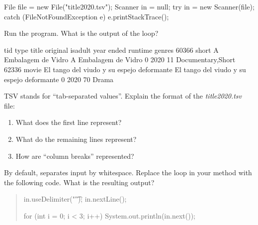 \begin{answer}[10em]
\begin{javaans}
File file = new File("title2020.tsv");
Scanner in = null;
try {
    in = new Scanner(file);
} catch (FileNotFoundException e) {
    e.printStackTrace();
}
\end{javaans}
\end{answer}


\Q Run the program. What is the output of the  loop?

\begin{answer}[4em]
\begin{javaans}
tid	type	title	original	isadult	year	ended	runtime	genres
60366	short	A Embalagem de Vidro	A Embalagem de Vidro	0	2020		11	Documentary,Short
62336	movie	El tango del viudo y su espejo deformante	El tango del viudo y su espejo deformante	0	2020		70	Drama
\end{javaans}
\end{answer}


\Q TSV stands for ``tab-separated values''.
Explain the format of the \textit{title2020.tsv} file:

\begin{enumerate}
\item What does the first line represent? 
\item What do the remaining lines represent? 
\item How are ``column breaks'' represented? 
\end{enumerate}
\vspace{-1em}


%


\Q By default,  separates input by whitespace.
Replace the  loop in your  method with the following code.
What is the resulting output?

\begin{quote}
\begin{javalst}
in.useDelimiter("\t");
in.nextLine();

for (int i = 0; i < 3; i++) {
    System.out.println(in.next());
}
\end{javalst}
\end{quote}
\vspace{-1em}

